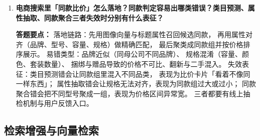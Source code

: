 \begin{interview}[题库与答题要点]
\begin{enumerate}[label=]
  \item[\textcolor{VioletDeep}{\textbf{Q43.}}] \textbf{电商搜索里「同款比价」怎么落地？同款判定容易出哪类错误？类目预测、属性抽取、同款聚合三者失效时分别有什么表征？}
\par\smallskip\noindent\textcolor{VioletDeep}{\textbf{答题要点：}}
落地链路：先用图像向量与标题属性召回候选同款，
再用属性对齐（品牌、型号、容量、规格）做精确匹配，
最后聚类成同款组并按价格排序展示。
易错类型：品牌近似（同母公司不同品牌）、
规格混淆（容量、颜色、套装数量）、
捆绑与赠品导致的价格不可比、翻新与二手混入。
失效表征：类目预测错会让同款组里混入不同品类，
表现为比价卡片「看着不像同一样东西」；
属性抽取错会让规格无法对齐，表现为同款组过大或过小；
同款聚合错会把不同型号聚成一组，表现为价格区间异常宽。
三者都要有线上抽检机制与用户反馈入口。

\end{enumerate}

\end{interview}

\subsection{检索增强与向量检索}

